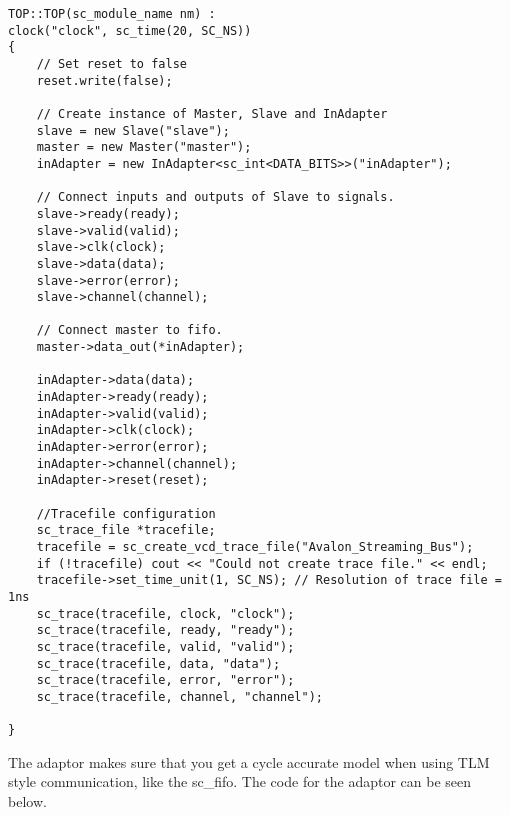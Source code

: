 \begin{lstlisting}
TOP::TOP(sc_module_name nm) :
clock("clock", sc_time(20, SC_NS))
{
	// Set reset to false
	reset.write(false);
	
	// Create instance of Master, Slave and InAdapter
	slave = new Slave("slave");
	master = new Master("master");
	inAdapter = new InAdapter<sc_int<DATA_BITS>>("inAdapter");
	
	// Connect inputs and outputs of Slave to signals.
	slave->ready(ready);
	slave->valid(valid);
	slave->clk(clock);
	slave->data(data);
	slave->error(error);
	slave->channel(channel);
	
	// Connect master to fifo.
	master->data_out(*inAdapter);
	
	inAdapter->data(data);
	inAdapter->ready(ready);
	inAdapter->valid(valid);
	inAdapter->clk(clock);
	inAdapter->error(error);
	inAdapter->channel(channel);
	inAdapter->reset(reset);
	
	//Tracefile configuration
	sc_trace_file *tracefile;
	tracefile = sc_create_vcd_trace_file("Avalon_Streaming_Bus");
	if (!tracefile) cout << "Could not create trace file." << endl;
	tracefile->set_time_unit(1, SC_NS); // Resolution of trace file = 1ns
	sc_trace(tracefile, clock, "clock");
	sc_trace(tracefile, ready, "ready");
	sc_trace(tracefile, valid, "valid");
	sc_trace(tracefile, data, "data");
	sc_trace(tracefile, error, "error");
	sc_trace(tracefile, channel, "channel");

}
\end{lstlisting}


The adaptor makes sure that you get a cycle accurate model when using TLM style communication, like the sc\_fifo. The code for the adaptor can be seen below.

